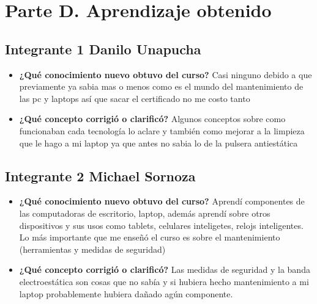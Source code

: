 \documentclass{article}
\begin{document}
\section{Parte D. Aprendizaje obtenido}
\label{sec:orgadba466}

\subsection{Integrante 1 Danilo Unapucha}
\label{sec:orgdc4494a}
\begin{itemize}
\item \textbf{¿Qué conocimiento nuevo obtuvo del curso?} Casi ninguno debido a
que previamente ya sabia mas o menos como es el mundo del
mantenimiento de las pc y laptops así que sacar el certificado no
me costo tanto
\item \textbf{¿Qué concepto corrigió o clarificó?} Algunos conceptos sobre
como funcionaban cada tecnología lo aclare y también como mejorar
a la limpieza que le hago a mi laptop ya que antes no sabia lo de
la pulsera antiestática
\end{itemize}

\subsection{Integrante 2 Michael Sornoza}
\label{sec:org1827fc7}
\begin{itemize}
\item \textbf{¿Qué conocimiento nuevo obtuvo del curso?} Aprendí componentes de las
computadoras de escritorio, laptop, además aprendí sobre otros dispositivos
y sus usos como tablets, celulares inteligetes, relojs inteligentes. Lo
más importante que me enseñó el curso es sobre el mantenimiento (herramientas y medidas de seguridad)
\item \textbf{¿Qué concepto corrigió o clarificó?} Las medidas de seguridad y la banda electroestática
son cosas que no sabía y si hubiera hecho mantenimiento a mi laptop probablemente
hubiera dañado agún componente.
\end{itemize}
\end{document}

